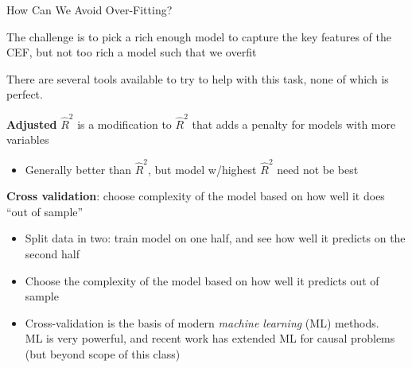 \documentclass[11pt,english,handout]{beamer}
\newenvironment{wideitemize}{\itemize\addtolength{\itemsep}{10pt}}{\enditemize}
\begin{document}
\begin{frame}{How Can We Avoid Over-Fitting?}
	\begin{wideitemize}
		
		\item
		The challenge is to pick a rich enough model to capture the key features of the CEF, but not too rich a model such that we overfit
		
		\pause
		\item
		There are several tools available to try to help with this task, none of which is perfect. 
		
		\pause
		\item
		\textbf{Adjusted} $\hat{R}^2$ is a modification to $\hat{R}^2$ that adds a penalty for models with more variables
		\begin{itemize}
			\item
			Generally better than $\hat{R}^2$, but model w/highest $\hat{R}^2$ need not be best
		\end{itemize}	
		
		\pause
		\item
		\textbf{Cross validation}: choose complexity of the model based on how well it does ``out of sample'' \pause
		\begin{itemize}
			\item 
			Split data in two: train model on one half, and see how well it predicts on the second half
			
			\item
			Choose the complexity of the model based on how well it predicts out of sample
			
			\pause
			\item
			Cross-validation is the basis of modern \textit{machine learning} (ML) methods. \\
			ML is very powerful, and recent work has extended ML for causal problems (but beyond scope of this class)
		\end{itemize}
		
	\end{wideitemize}		
\end{frame}	
\end{document}
